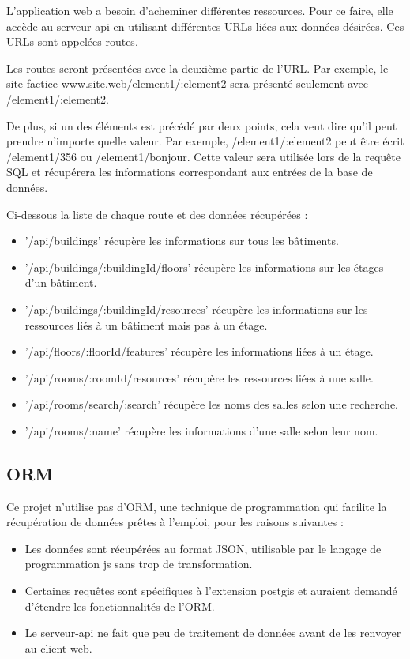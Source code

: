 \documentclass[
    iai, %
    il, %
]{heig-tb}
\begin{document}
L'application web a besoin d'acheminer différentes ressources. Pour ce faire, elle accède au serveur-api en utilisant différentes URLs liées aux données désirées.
Ces URLs sont appelées routes.

Les routes seront présentées avec la deuxième partie de l'URL.
Par exemple, le site factice www.site.web/element1/:element2 sera présenté seulement avec /element1/:element2.

De plus, si un des éléments est précédé par deux points, cela veut dire qu'il peut prendre n'importe quelle valeur.
Par exemple, /element1/:element2 peut être écrit /element1/356 ou /element1/bonjour.
Cette valeur sera utilisée lors de la requête SQL et récupérera les informations correspondant aux entrées de la base de données.

Ci-dessous la liste de chaque route et des données récupérées :

\begin{itemize}
    \item '/api/buildings' récupère les informations sur tous les bâtiments.
    \item '/api/buildings/:buildingId/floors' récupère les informations sur les étages d'un bâtiment.
    \item '/api/buildings/:buildingId/resources' récupère les informations sur les ressources liés à un bâtiment mais pas à un étage.
    \item '/api/floors/:floorId/features' récupère les informations liées à un étage.
    \item '/api/rooms/:roomId/resources' récupère les ressources liées à une salle.
    \item '/api/rooms/search/:search' récupère les noms des salles selon une recherche.
    \item '/api/rooms/:name' récupère les informations d'une salle selon leur nom.
\end{itemize}

\subsection{ORM}
Ce projet n'utilise pas d'ORM,
une technique de programmation qui facilite la récupération de données prêtes à l'emploi, pour les raisons suivantes :
\begin{itemize}
    \item Les données sont récupérées au format JSON, utilisable par le langage de programmation \gls{js} sans trop de transformation.
    \item Certaines requêtes sont spécifiques à l'extension \gls{postgis} et auraient demandé d'étendre les fonctionnalités de l'ORM.
    \item Le serveur-api ne fait que peu de traitement de données avant de les renvoyer au client web.
\end{itemize}
\end{document}
